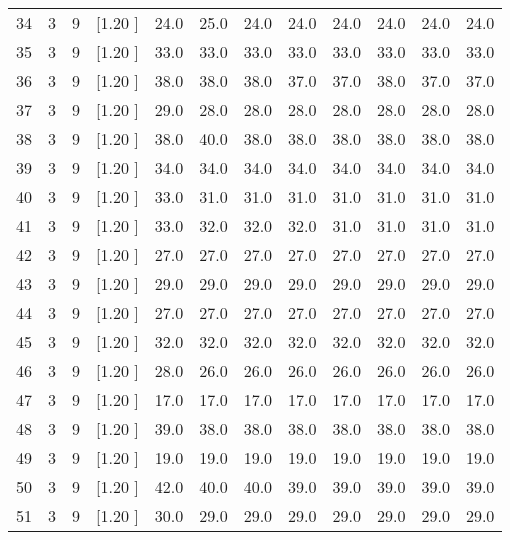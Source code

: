 \documentclass[12pt,a4paper]{article}
\begin{document}
\begin{center}
{\begin{tabular}{r r r r r r r r r r r r}
  34&  3&  9&[1.20      ]&    24.0&    25.0&    24.0&    24.0&    24.0&    24.0&    24.0&    24.0\\[-0.02in]
  35&  3&  9&[1.20      ]&    33.0&    33.0&    33.0&    33.0&    33.0&    33.0&    33.0&    33.0\\[-0.02in]
  36&  3&  9&[1.20      ]&    38.0&    38.0&    38.0&    37.0&    37.0&    38.0&    37.0&    37.0\\[-0.02in]
  37&  3&  9&[1.20      ]&    29.0&    28.0&    28.0&    28.0&    28.0&    28.0&    28.0&    28.0\\[-0.02in]
  38&  3&  9&[1.20      ]&    38.0&    40.0&    38.0&    38.0&    38.0&    38.0&    38.0&    38.0\\[-0.02in]
  39&  3&  9&[1.20      ]&    34.0&    34.0&    34.0&    34.0&    34.0&    34.0&    34.0&    34.0\\[-0.02in]
  40&  3&  9&[1.20      ]&    33.0&    31.0&    31.0&    31.0&    31.0&    31.0&    31.0&    31.0\\[-0.02in]
  41&  3&  9&[1.20      ]&    33.0&    32.0&    32.0&    32.0&    31.0&    31.0&    31.0&    31.0\\[-0.02in]
  42&  3&  9&[1.20      ]&    27.0&    27.0&    27.0&    27.0&    27.0&    27.0&    27.0&    27.0\\[-0.02in]
  43&  3&  9&[1.20      ]&    29.0&    29.0&    29.0&    29.0&    29.0&    29.0&    29.0&    29.0\\[-0.02in]
  44&  3&  9&[1.20      ]&    27.0&    27.0&    27.0&    27.0&    27.0&    27.0&    27.0&    27.0\\[-0.02in]
  45&  3&  9&[1.20      ]&    32.0&    32.0&    32.0&    32.0&    32.0&    32.0&    32.0&    32.0\\[-0.02in]
  46&  3&  9&[1.20      ]&    28.0&    26.0&    26.0&    26.0&    26.0&    26.0&    26.0&    26.0\\[-0.02in]
  47&  3&  9&[1.20      ]&    17.0&    17.0&    17.0&    17.0&    17.0&    17.0&    17.0&    17.0\\[-0.02in]
  48&  3&  9&[1.20      ]&    39.0&    38.0&    38.0&    38.0&    38.0&    38.0&    38.0&    38.0\\[-0.02in]
  49&  3&  9&[1.20      ]&    19.0&    19.0&    19.0&    19.0&    19.0&    19.0&    19.0&    19.0\\[-0.02in]
  50&  3&  9&[1.20      ]&    42.0&    40.0&    40.0&    39.0&    39.0&    39.0&    39.0&    39.0\\[-0.02in]
  51&  3&  9&[1.20      ]&    30.0&    29.0&    29.0&    29.0&    29.0&    29.0&    29.0&    29.0\\[-0.02in]

\end{tabular}}
\end{center}
\end{document}
